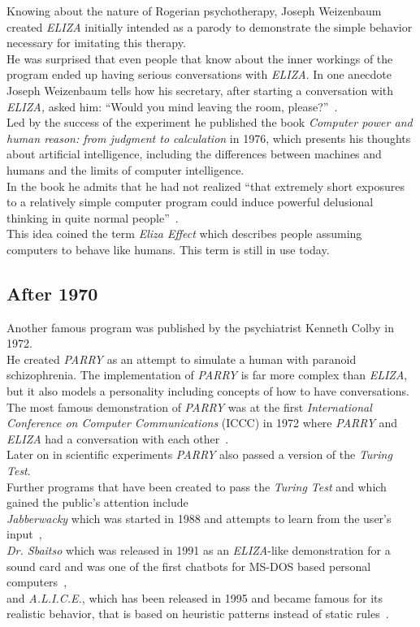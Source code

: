 Knowing about the nature of Rogerian psychotherapy, Joseph Weizenbaum created \emph{ELIZA} initially intended as a parody to demonstrate the simple behavior necessary for imitating this therapy.
\\
He was surprised that even people that know about the inner workings of the program ended up having serious conversations with \emph{ELIZA}.
In one anecdote Joseph Weizenbaum tells how his secretary, after starting a conversation with \emph{ELIZA,} asked him: ``Would you mind leaving the room, please?''~\cite[5]{weizenbaum}.
\\

Led by the success of the experiment he published the book \emph{Computer power and human reason: from judgment to calculation} in 1976,
which presents his thoughts about artificial intelligence,
including the differences between machines and humans and the limits of computer intelligence.
\\
In the book he admits that he had not realized ``that extremely short exposures to a relatively simple computer program could induce powerful delusional thinking in quite normal people''~\cite{bbcnowthen}.
\\
This idea coined the term \emph{Eliza Effect} which describes people assuming computers to behave like humans. This term is still in use today.


\subsection{After 1970}

Another famous program was published by the psychiatrist Kenneth Colby in 1972.
\\
He created \emph{PARRY} as an attempt to simulate a human with paranoid schizophrenia.
The implementation of \emph{PARRY} is far more complex than \emph{ELIZA},
but it also models a personality including concepts of how to have conversations.
\\
The most famous demonstration of \emph{PARRY} was at the first \emph{International Conference on Computer Communications} (ICCC) in 1972 where \emph{PARRY} and \emph{ELIZA} had a conversation with each other~\cite{internethistory}.
\\
Later on in scientific experiments \emph{PARRY} also passed a version of the \emph{Turing Test}.
\\

Further programs that have been created to pass the \emph{Turing Test} and which gained the public's attention include
\\
\emph{Jabberwacky} which was started in 1988 and attempts to learn from the user's input~\cite{jabberwacky},
\\
\emph{Dr. Sbaitso} which was released in 1991 as an \emph{ELIZA}-like demonstration for a sound card and was one of the first chatbots for MS-DOS based personal computers~\cite{pcmag},
\\
and \emph{A.L.I.C.E.}, which has been released in 1995 and became famous for its realistic behavior, that is based on heuristic patterns instead of static rules~\cite{approximatinglife}.
\\

